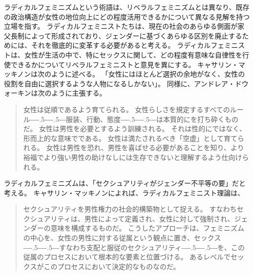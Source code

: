 \documentclass[paper=a4,book,openany]{jlreq}
\newcommand{\ig}[1]{}           %
\def\DDASH{―\kern-.5\zw―\kern-.5\zw―} %
\begin{document}
ラディカルフェミニズムという術語は、リベラルフェミニズムとは異なり、既存の政治構造が女性の地位向上にどの程度活用できるかについて異なる見解を持つ立場を指す。
ラディカルフェミニストたちは、現在の社会のあらゆる側面が家父長制によって形成されており、ジェンダーに基づくあらゆる区別を廃止するためには、それを徹底的に変革する必要があると考える。
ラディカルフェミニストは、女性が生活の中で、特にセックスに関して、どの程度有意味な自律性を行使できるかについてリベラルフェミニストと意見を異にする。
キャサリン・マッキノンは次のように述べる。
「女性にはほとんど選択の余地がなく、女性の役割を自由に選択するような人物になるしかない」\citep[p.124]{mackinnon89:_towar_femin_theor_of_state}。
同様に、アンドレア・ドウォーキンは次のように主張する。
\ig{Andrea Dworkin}

\begin{quote}
  女性は従順であるよう育てられる。
女性らしさを規定するすべてのルール{\DDASH}服装、行動、態度{\DDASH}は本質的にを打ち砕くものだ。
女性は男性を必要とするよう訓練される。
それは性的にではなく、形而上的な意味でである。
女性は満たされるべき「空虚」として育てられる。
女性は男性を恐れ、男性を喜ばせる必要があることを知り、より裕福でより強い男性の助けなしには生存できないと理解するよう仕向けられる。
\citep[p.81]{dworkin83:_righ_wing_women}
\end{quote}

ラディカルフェミニズムは、「セクシュアリティがジェンダー不平等の要」だと考える。
キャサリン・マッキノンによれば、ラディカルフェミニスト理論は、
\begin{quote}
セクシュアリティを男性権力の社会的構築物として捉える。
すなわちセクシュアリティは、男性によって定義され、女性に対して強制され、ジェンダーの意味を構成するものだ。
こうしたアプローチは、フェミニズムの中心を、女性の男性に対する従属という観点に置き、セックス{\DDASH}すなわち支配と服従のセクシュアリティ{\DDASH}を、この従属のプロセスにおいて根本的な要素と位置づける。
あるレベルでセックスがこのプロセスにおいて決定的なものなのだ。
\citep[p.128]{mackinnon89:_towar_femin_theor_of_state}
\end{quote}
\end{document}
